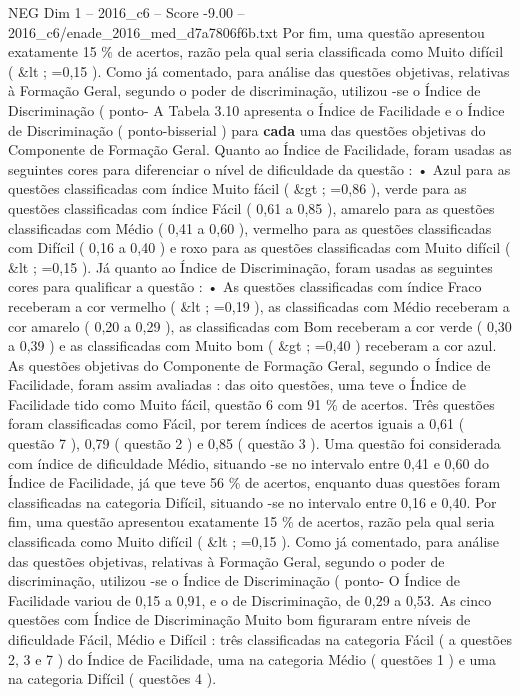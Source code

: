 \begin{textsample}{NEG Dim 1 – 2016\_c6 – Score -9.00 – 2016\_c6/enade\_2016\_med\_d7a7806f6b.txt}
Por fim, uma questão apresentou exatamente 15 \% de acertos, razão pela qual seria classificada como Muito difícil ( \&lt ; =0,15 ).
Como já comentado, para análise das questões objetivas, relativas à Formação Geral, segundo o poder de discriminação, utilizou -se o Índice de Discriminação ( ponto- A Tabela 3.10 apresenta o Índice de Facilidade e o Índice de Discriminação ( ponto-bisserial ) para \textbf{cada} uma das questões objetivas do Componente de Formação Geral.
Quanto ao Índice de Facilidade, foram usadas as seguintes cores para diferenciar o nível de dificuldade da questão : • Azul para as questões classificadas com índice Muito fácil ( \&gt ; =0,86 ), verde para as questões classificadas com índice Fácil ( 0,61 a 0,85 ), amarelo para as questões classificadas com Médio ( 0,41 a 0,60 ), vermelho para as questões classificadas com Difícil ( 0,16 a 0,40 ) e roxo para as questões classificadas com Muito difícil ( \&lt ; =0,15 ).
Já quanto ao Índice de Discriminação, foram usadas as seguintes cores para qualificar a questão : • As questões classificadas com índice Fraco receberam a cor vermelho ( \&lt ; =0,19 ), as classificadas com Médio receberam a cor amarelo ( 0,20 a 0,29 ), as classificadas com Bom receberam a cor verde ( 0,30 a 0,39 ) e as classificadas com Muito bom ( \&gt ; =0,40 ) receberam a cor azul.
As questões objetivas do Componente de Formação Geral, segundo o Índice de Facilidade, foram assim avaliadas : das oito questões, uma teve o Índice de Facilidade tido como Muito fácil, questão 6 com 91 \% de acertos.
Três questões foram classificadas como Fácil, por terem índices de acertos iguais a 0,61 ( questão 7 ), 0,79 ( questão 2 ) e 0,85 ( questão 3 ).
Uma questão foi considerada com índice de dificuldade Médio, situando -se no intervalo entre 0,41 e 0,60 do Índice de Facilidade, já que teve 56 \% de acertos, enquanto duas questões foram classificadas na categoria Difícil, situando -se no intervalo entre 0,16 e 0,40.
Por fim, uma questão apresentou exatamente 15 \% de acertos, razão pela qual seria classificada como Muito difícil ( \&lt ; =0,15 ).
Como já comentado, para análise das questões objetivas, relativas à Formação Geral, segundo o poder de discriminação, utilizou -se o Índice de Discriminação ( ponto- O Índice de Facilidade variou de 0,15 a 0,91, e o de Discriminação, de 0,29 a 0,53.
As cinco questões com Índice de Discriminação Muito bom figuraram entre níveis de dificuldade Fácil, Médio e Difícil : três classificadas na categoria Fácil ( a questões 2, 3 e 7 ) do Índice de Facilidade, uma na categoria Médio ( questões 1 ) e uma na categoria Difícil ( questões 4 ).

\end{textsample}
